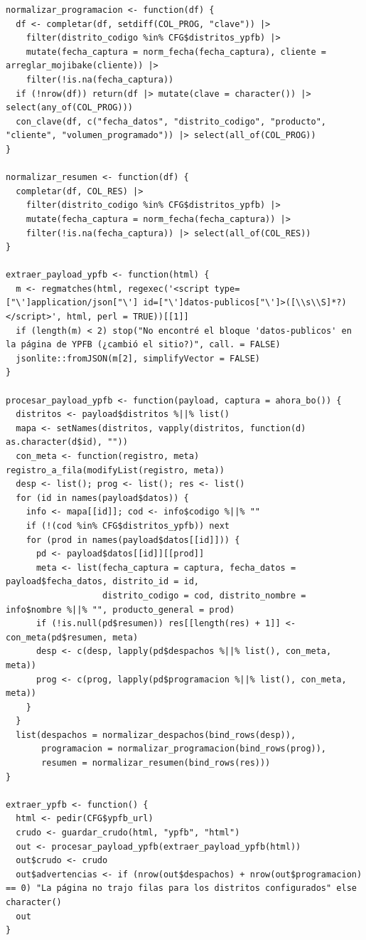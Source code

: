 \begin{lstlisting}[style=anexoR]
normalizar_programacion <- function(df) {
  df <- completar(df, setdiff(COL_PROG, "clave")) |>
    filter(distrito_codigo %in% CFG$distritos_ypfb) |>
    mutate(fecha_captura = norm_fecha(fecha_captura), cliente = arreglar_mojibake(cliente)) |>
    filter(!is.na(fecha_captura))
  if (!nrow(df)) return(df |> mutate(clave = character()) |> select(any_of(COL_PROG)))
  con_clave(df, c("fecha_datos", "distrito_codigo", "producto", "cliente", "volumen_programado")) |> select(all_of(COL_PROG))
}

normalizar_resumen <- function(df) {
  completar(df, COL_RES) |>
    filter(distrito_codigo %in% CFG$distritos_ypfb) |>
    mutate(fecha_captura = norm_fecha(fecha_captura)) |>
    filter(!is.na(fecha_captura)) |> select(all_of(COL_RES))
}

extraer_payload_ypfb <- function(html) {
  m <- regmatches(html, regexec('<script type=["\']application/json["\'] id=["\']datos-publicos["\']>([\\s\\S]*?)</script>', html, perl = TRUE))[[1]]
  if (length(m) < 2) stop("No encontré el bloque 'datos-publicos' en la página de YPFB (¿cambió el sitio?)", call. = FALSE)
  jsonlite::fromJSON(m[2], simplifyVector = FALSE)
}

procesar_payload_ypfb <- function(payload, captura = ahora_bo()) {
  distritos <- payload$distritos %||% list()
  mapa <- setNames(distritos, vapply(distritos, function(d) as.character(d$id), ""))
  con_meta <- function(registro, meta) registro_a_fila(modifyList(registro, meta))
  desp <- list(); prog <- list(); res <- list()
  for (id in names(payload$datos)) {
    info <- mapa[[id]]; cod <- info$codigo %||% ""
    if (!(cod %in% CFG$distritos_ypfb)) next
    for (prod in names(payload$datos[[id]])) {
      pd <- payload$datos[[id]][[prod]]
      meta <- list(fecha_captura = captura, fecha_datos = payload$fecha_datos, distrito_id = id,
                   distrito_codigo = cod, distrito_nombre = info$nombre %||% "", producto_general = prod)
      if (!is.null(pd$resumen)) res[[length(res) + 1]] <- con_meta(pd$resumen, meta)
      desp <- c(desp, lapply(pd$despachos %||% list(), con_meta, meta))
      prog <- c(prog, lapply(pd$programacion %||% list(), con_meta, meta))
    }
  }
  list(despachos = normalizar_despachos(bind_rows(desp)),
       programacion = normalizar_programacion(bind_rows(prog)),
       resumen = normalizar_resumen(bind_rows(res)))
}

extraer_ypfb <- function() {
  html <- pedir(CFG$ypfb_url)
  crudo <- guardar_crudo(html, "ypfb", "html")
  out <- procesar_payload_ypfb(extraer_payload_ypfb(html))
  out$crudo <- crudo
  out$advertencias <- if (nrow(out$despachos) + nrow(out$programacion) == 0) "La página no trajo filas para los distritos configurados" else character()
  out
}
\end{lstlisting}

